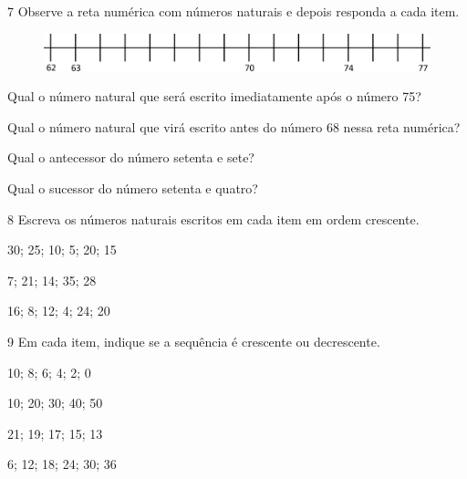 \num{7} Observe a reta numérica com números naturais e depois responda a cada item.

\begin{figure}[htpb!]
\includegraphics[width=\textwidth]{./media/image31.png}
\end{figure}

\begin{escolha}
\item Qual o número natural que será escrito imediatamente após o número 75?

\item Qual o número natural que virá escrito antes do número 68 nessa reta numérica?

\item Qual o antecessor do número setenta e sete?
\reduline{76\hfill}

\item Qual o sucessor do número setenta e quatro?
\reduline{75\hfill}
\end{escolha}

\num{8} Escreva os números naturais escritos em cada item em ordem crescente.

\begin{escolha}
\item 30; 25; 10; 5; 20; 15

\item 7; 21; 14; 35; 28

\item 16; 8; 12; 4; 24; 20
\end{escolha}

\num{9} Em cada item, indique se a sequência é crescente ou decrescente.

\begin{escolha}
\item 10; 8; 6; 4; 2; 0

\item 10; 20; 30; 40; 50

\item 21; 19; 17; 15; 13

\item 6; 12; 18; 24; 30; 36
\end{escolha}

